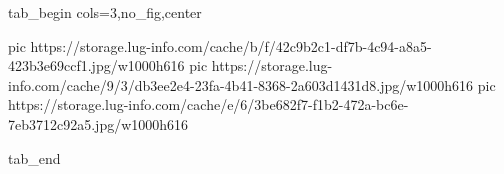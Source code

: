  
 
 
 
 


\ifcmt
  tab_begin cols=3,no_fig,center

     pic https://storage.lug-info.com/cache/b/f/42c9b2c1-df7b-4c94-a8a5-423b3e69ccf1.jpg/w1000h616%
		 pic https://storage.lug-info.com/cache/9/3/db3ee2e4-23fa-4b41-8368-2a603d1431d8.jpg/w1000h616%
		 pic https://storage.lug-info.com/cache/e/6/3be682f7-f1b2-472a-bc6e-7eb3712c92a5.jpg/w1000h616%

  tab_end
\fi
